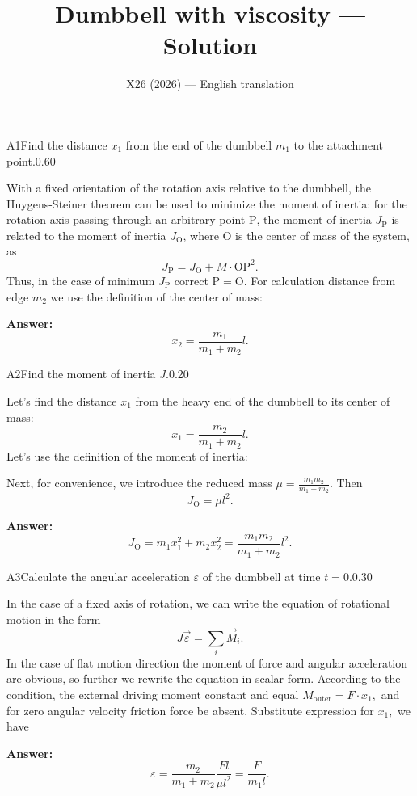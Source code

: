 \documentclass[11pt,a4paper]{article}
\title{\textbf{Dumbbell with viscosity --- Solution}}
\author{\normalsize X26 (2026) — English translation}
\date{}
\begin{document}
\maketitle\vspace{-0.5em}
\begin{solcard}{A1}{Find the distance $x_1$ from the end of the dumbbell $m_1$ to the attachment point.}{0.60}

With a fixed orientation of the rotation axis relative to the dumbbell, the Huygens-Steiner theorem can be used to minimize the moment of inertia: for the rotation axis passing through an arbitrary point $\mathrm{P}$, the moment of inertia $J_{\mathrm{P}}$ is related to the moment of inertia $J_{\mathrm{O}}$, where $\mathrm{O}$ is the center of mass of the system, as $$J_{\mathrm{P}} = J_{\mathrm{O}} + M\cdot\mathrm{OP}^2.$$ Thus, in the case of minimum $J_{\mathrm{P}}$ correct $\mathrm{P} = \mathrm{O}$. For calculation distance from edge $m_2$ we use the definition of the center of mass:

\par\smallskip\noindent\textbf{Answer:} $$x_2 = \frac{m_1}{m_1 + m_2}l.$$
\end{solcard}

\begin{solcard}{A2}{Find the moment of inertia $J$.}{0.20}

Let's find the distance $x_1$ from the heavy end of the dumbbell to its center of mass: $$x_1 = \frac{m_2}{m_1 + m_2}l.$$ Let's use the definition of the moment of inertia:


Next, for convenience, we introduce the reduced mass $\mu = \frac{m_1m_2}{m_1 + m_2}.$ Then $$J_{\mathrm{O}} = \mu l^2.$$

\par\smallskip\noindent\textbf{Answer:} $$J_{\mathrm{O}} = m_1x_1^2 + m_2x_2^2 = \frac{m_1m_2}{m_1 + m_2}l^2.$$
\end{solcard}

\begin{solcard}{A3}{Calculate the angular acceleration $\varepsilon$ of the dumbbell at time $t = 0$.}{0.30}

In the case of a fixed axis of rotation, we can write the equation of rotational motion in the form $$J\vec{\varepsilon} = \sum \limits_{i}\vec{M}_{i}.$$ In the case of flat motion direction the moment of force and angular acceleration are obvious, so further we rewrite the equation in scalar form. According to the condition, the external driving moment constant and equal $M_{\text{outer}} = F\cdot x_1,$ and for zero angular velocity friction force be absent. Substitute expression for $x_1,$ we have

\par\smallskip\noindent\textbf{Answer:} $$\varepsilon = \frac{m_2}{m_1 + m_2}\frac{Fl}{\mu l^2} = \frac{F}{m_1 l}.$$
\end{solcard}
\end{document}
